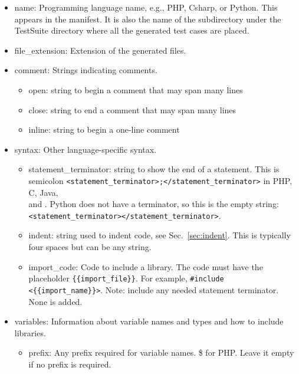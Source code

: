 \begin{itemize}
    \item name: Programming language name, e.g., PHP, Csharp,
    or Python. This appears in the manifest.
    It is also the name of the subdirectory under the TestSuite directory
    where all the generated test cases are placed.

    \item file\_extension: Extension of the generated files.

    \item comment: Strings indicating comments.
    \begin{itemize}
        \item open: string to begin a comment that may span many lines
        \item close: string to end a comment that may span many lines
        \item inline: string to begin a one-line comment
    \end{itemize}
    
    \item syntax: Other language-specific syntax.
    \begin{itemize}
        \item statement\_terminator: string to show the end of 
        a statement.
        This is semicolon
        \verb|<statement_terminator>;</statement_terminator>|
        in PHP, C, Java, \\ and \CSharp. Python does not have 
        a terminator, so this is the empty string: \\
        \verb|<statement_terminator></statement_terminator>|.

        \item indent: string used to indent code, see Sec.~\ref{sec:indent}.
          This is typically four spaces but
          can be any string.

        \item import\_code: Code to include a library. The code
        must have the placeholder \verb|{{import_file}}|.
        For example, \verb|#include <{{import_name}}>|.
        Note: include any needed statement terminator.  None is added.
    \end{itemize}
    
    \item variables: Information about variable names and types and how
    to include libraries.
    \begin{itemize}
        \item prefix: Any prefix required for variable names.
        \$ for PHP.
        Leave it empty if no prefix is required.


\end{itemize}
\end{itemize}

